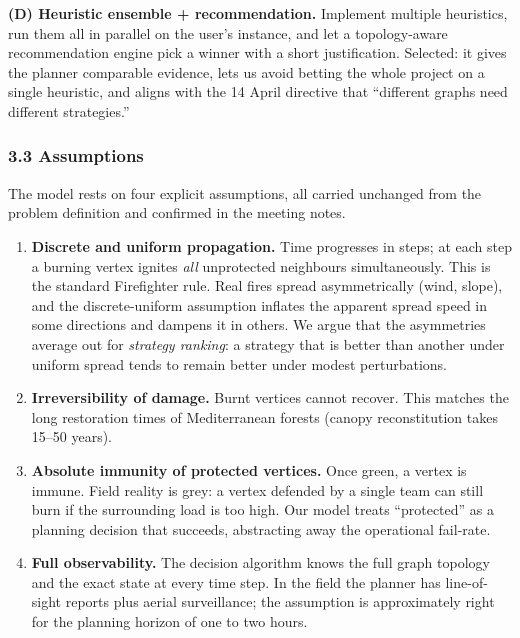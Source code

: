 \documentclass[
  11pt,
]{article}
\providecommand{\tightlist}{%
  \setlength{\itemsep}{0pt}\setlength{\parskip}{0pt}}
\begin{document}
\textbf{(D) Heuristic ensemble + recommendation.} Implement multiple
heuristics, run them all in parallel on the user's instance, and let a
topology-aware recommendation engine pick a winner with a short
justification. Selected: it gives the planner comparable evidence, lets
us avoid betting the whole project on a single heuristic, and aligns
with the 14 April directive that ``different graphs need different
strategies.''

\subsubsection{3.3 Assumptions}\label{assumptions}

The model rests on four explicit assumptions, all carried unchanged from
the problem definition and confirmed in the meeting notes.

\begin{enumerate}
\def\labelenumi{\arabic{enumi}.}
\tightlist
\item
  \textbf{Discrete and uniform propagation.} Time progresses in steps;
  at each step a burning vertex ignites \emph{all} unprotected
  neighbours simultaneously. This is the standard Firefighter rule. Real
  fires spread asymmetrically (wind, slope), and the discrete-uniform
  assumption inflates the apparent spread speed in some directions and
  dampens it in others. We argue that the asymmetries average out for
  \emph{strategy ranking}: a strategy that is better than another under
  uniform spread tends to remain better under modest perturbations.
\item
  \textbf{Irreversibility of damage.} Burnt vertices cannot recover.
  This matches the long restoration times of Mediterranean forests
  (canopy reconstitution takes 15--50 years).
\item
  \textbf{Absolute immunity of protected vertices.} Once green, a vertex
  is immune. Field reality is grey: a vertex defended by a single team
  can still burn if the surrounding load is too high. Our model treats
  ``protected'' as a planning decision that succeeds, abstracting away
  the operational fail-rate.
\item
  \textbf{Full observability.} The decision algorithm knows the full
  graph topology and the exact state at every time step. In the field
  the planner has line-of-sight reports plus aerial surveillance; the
  assumption is approximately right for the planning horizon of one to
  two hours.
\end{enumerate}
\end{document}
